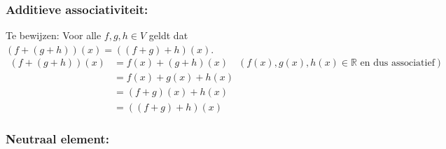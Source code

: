 \documentclass{article}
\newcommand{\R}{\mathbb{R}}
\begin{document}
\subsubsection*{Additieve associativiteit:}
Te bewijzen: Voor alle $f, g, h \in V$ geldt dat $(f+(g+h))(x) = ((f + g) + h)(x)$.
\begin{align*}
    (f + (g + h))(x) & = f(x) + (g + h)(x)  \quad (f(x), g(x), h(x) \in \R \text{ en dus associatief}) \\
                     & = f(x) + g(x) + h(x)                                                            \\
                     & = (f + g)(x) + h(x)                                                             \\
                     & = ((f + g)+h)(x)
\end{align*}
\subsubsection*{Neutraal element:}
\end{document}
